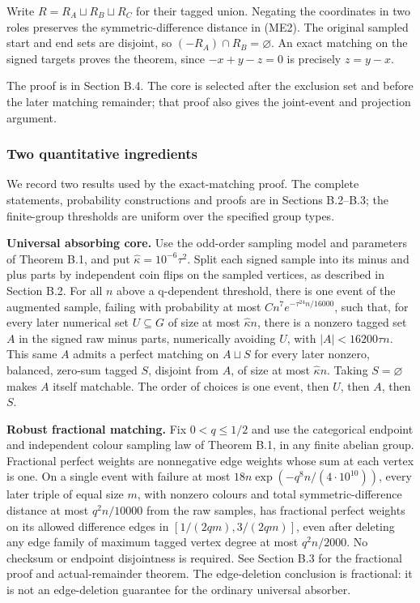 \documentclass[11pt,a4paper]{article}
\newcommand{\statementstart}{\par\addvspace{6pt plus 1pt minus 1pt}\noindent}
\begin{document}
Write \(R=R_A\sqcup R_B\sqcup R_C\) for their tagged union. Negating the coordinates in two roles preserves the symmetric-difference distance in (ME2). The original sampled start and end sets are disjoint, so \((-R_A)\cap R_B=\varnothing\). An exact matching on the signed targets proves the theorem, since \(-x+y-z=0\) is precisely \(z=y-x\).

The proof is in Section B.4. The core is selected after the exclusion set and before the later matching remainder; that proof also gives the joint-event and projection argument.

\hypertarget{two-quantitative-ingredients}{%
\subsubsection{Two quantitative ingredients}\label{two-quantitative-ingredients}}

We record two results used by the exact-matching proof. The complete statements, probability constructions and proofs are in Sections B.2--B.3; the finite-group thresholds are uniform over the specified group types.

\statementstart\textbf{Universal absorbing core.} Use the odd-order sampling model and parameters of Theorem B.1, and put \(\widehat\kappa=10^{-6}\tau^2\). Split each signed sample into its minus and plus parts by independent coin flips on the sampled vertices, as described in Section B.2. For all \(n\) above a q-dependent threshold, there is one event of the augmented sample, failing with probability at most \(C n^7e^{-\tau^{24}n/16000}\), such that, for every later numerical set \(U\subseteq G\) of size at most \(\widehat\kappa n\), there is a nonzero tagged set \(A\) in the signed raw minus parts, numerically avoiding \(U\), with \(|A|<16200\tau n\). This same \(A\) admits a perfect matching on \(A\sqcup S\) for every later nonzero, balanced, zero-sum tagged \(S\), disjoint from \(A\), of size at most \(\widehat\kappa n\). Taking \(S=\varnothing\) makes \(A\) itself matchable. The order of choices is one event, then \(U\), then \(A\), then \(S\).

\statementstart\textbf{Robust fractional matching.} Fix \(0<q\le1/2\) and use the categorical endpoint and independent colour sampling law of Theorem B.1, in any finite abelian group. Fractional perfect weights are nonnegative edge weights whose sum at each vertex is one. On a single event with failure at most \(18n\exp(-q^8n/(4\cdot10^{10}))\), every later triple of equal size \(m\), with nonzero colours and total symmetric-difference distance at most \(q^2n/10000\) from the raw samples, has fractional perfect weights on its allowed difference edges in \([1/(2qm),3/(2qm)]\), even after deleting any edge family of maximum tagged vertex degree at most \(q^2n/2000\). No checksum or endpoint disjointness is required. See Section B.3 for the fractional proof and actual-remainder theorem. The edge-deletion conclusion is fractional: it is not an edge-deletion guarantee for the ordinary universal absorber.
\end{document}
